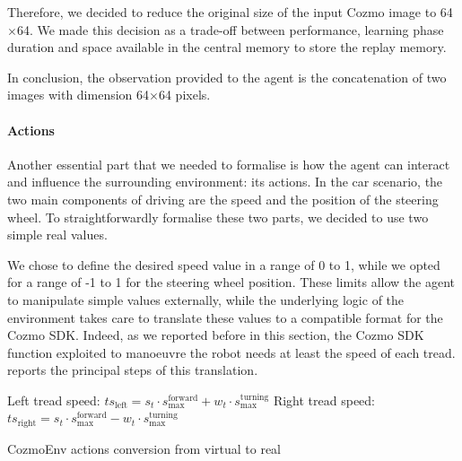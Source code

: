 Therefore, we decided to reduce the original size of the input Cozmo image to 64$\times$64. We made this decision as a trade-off between performance, learning phase duration and space available in the central memory to store the replay memory.

In conclusion, the observation provided to the agent is the concatenation of two images with dimension 64$\times$64 pixels.

\paragraph{Actions} 

Another essential part that we needed to formalise is how the agent can interact and influence the surrounding environment: its actions. In the car scenario, the two main components of driving are the speed and the position of the steering wheel. To straightforwardly formalise these two parts, we decided to use two simple real values.

We chose to define the desired speed value in a range of 0 to 1, while we opted for a range of -1 to 1 for the steering wheel position. These limits allow the agent to manipulate simple values externally, while the underlying logic of the environment takes care to translate these values to a compatible format for the Cozmo SDK. 
Indeed, as we reported before in this section, the Cozmo SDK function exploited to manoeuvre the robot needs at least the speed of each tread.  reports the principal steps of this translation.

\begin{algorithm}[!h]
	\SetAlgoLined
	\small
	\DontPrintSemicolon
	\LinesNumbered

	Left tread speed: $ts_{\text{left}} = s_t \cdot s^{\text{forward}}_{\text{max}} + w_t \cdot s^{\text{turning}}_{\text{max}}$\;
	Right tread speed: $ts_{\text{right}} = s_t \cdot s^{\text{forward}}_{\text{max}} - w_t \cdot s^{\text{turning}}_{\text{max}}$

	\caption{CozmoEnv actions conversion from virtual to real}
	\label{conversionCozmoEnv}
\end{algorithm}

